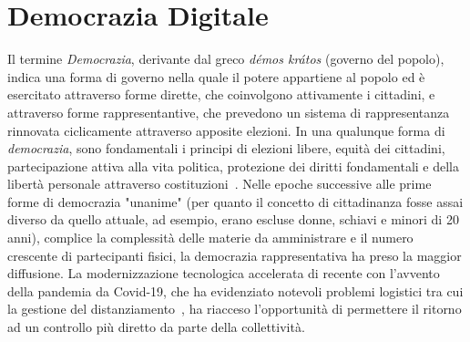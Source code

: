 \documentclass[12pt,a4paper,openright,twoside]{book}
\begin{document}
\chapter{Democrazia Digitale}
Il termine \textit{Democrazia}, derivante dal greco \textit{démos krátos} (governo del popolo),
indica una forma di governo nella quale il potere appartiene al popolo ed è esercitato attraverso forme dirette, che coinvolgono attivamente
i cittadini, e attraverso forme rappresentantive, che prevedono un sistema di rappresentanza rinnovata ciclicamente
attraverso apposite elezioni.
In una qualunque forma di \textit{democrazia}, sono fondamentali i principi di elezioni libere, equità dei cittadini, partecipazione
attiva alla vita politica, protezione dei diritti fondamentali e della libertà personale attraverso costituzioni~\cite{vinod2017state}.
Nelle epoche successive alle prime forme di democrazia "unanime" (per quanto il concetto di cittadinanza fosse assai diverso da quello attuale,
ad esempio, erano escluse donne, schiavi e minori di 20 anni), complice la complessità
delle materie da amministrare e il numero crescente di partecipanti fisici, la democrazia
rappresentativa ha preso la maggior diffusione. 
La modernizzazione tecnologica accelerata di recente con l'avvento della pandemia da Covid-19, che ha evidenziato notevoli problemi
logistici tra cui la gestione del distanziamento~\cite{sotoacosta}, ha riacceso l'opportunità di
permettere il ritorno ad un controllo più diretto da parte della collettività.
\end{document}
